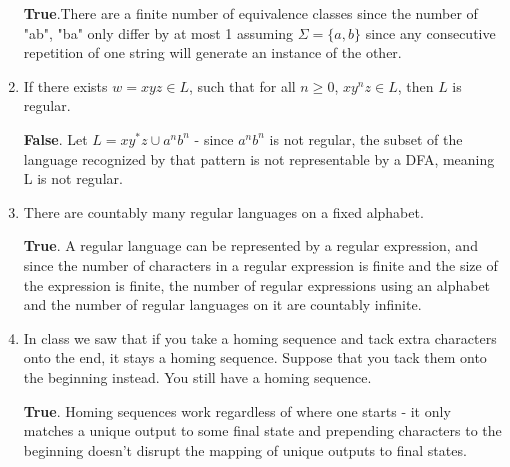 \begin{enumerate}[label=(\alph*) {\bf ~~~T~~~~F~~~~ },leftmargin=*]
\textbf{True}.There are a finite number of equivalence classes since the number of "ab", "ba" only differ by at most 1 assuming $\Sigma=\{a,b\}$ since any consecutive repetition of one string will generate an instance of the other.
\tfspacing

\item If there exists  $w=xyz\in L$, such that for all $n\geq0$, $xy^nz \in L$, then $L$ is regular.

\textbf{False}. Let $L=xy^*z\cup a^nb^n$ - since $a^nb^n$ is not regular, the subset of the language recognized by that pattern is not representable by a DFA, meaning L is not regular.
\tfspacing

\item There are countably many regular languages on a fixed alphabet.

\textbf{True}. A regular language can be represented by a regular expression, and since the number of characters in a regular expression is finite and the size of the expression is finite, the number of regular expressions using an alphabet and the number of regular languages on it are countably infinite.
\tfspacing

\item   In class we saw that if you take a homing sequence and tack extra characters onto the end, it stays a homing sequence.  Suppose that you tack them onto the beginning instead.  You still have a homing sequence.

\textbf{True}. Homing sequences work regardless of where one starts - it only matches a unique output to some final state and prepending characters to the beginning doesn't disrupt the mapping of unique outputs to final states.

\end{enumerate}







